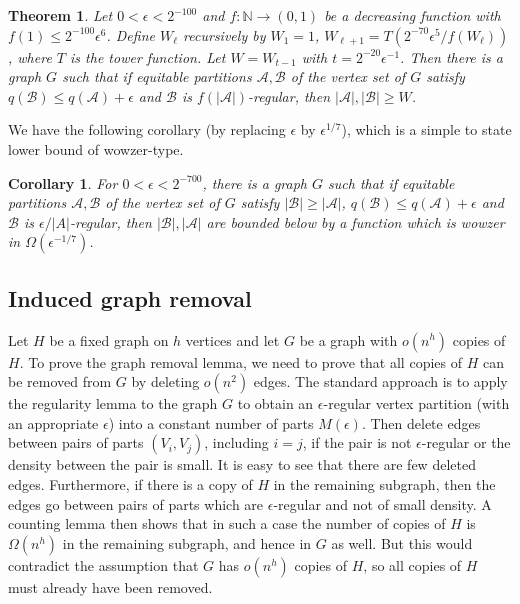 \documentclass[11pt]{article}
\newtheorem{theorem}{Theorem}[section]
\newtheorem{corollary}{Corollary}[section]
\begin{document}
\begin{theorem} \label{stronglow}
Let $0<\epsilon<2^{-100}$ and $f:\mathbb{N} \rightarrow (0,1)$ be a decreasing function with $f(1) \leq 2^{-100}\epsilon^{6}$. Define
$W_{\ell}$ recursively by $W_1=1$, $W_{\ell+1} =
T\left(2^{-70}\epsilon^5/f(W_{\ell})\right)$, where $T$ is the tower function.
Let $W=W_{t-1}$ with $t=2^{-20}\epsilon^{-1}$. Then there is a graph $G$ such
that if equitable partitions $\mathcal{A},\mathcal{B}$ of the vertex set of $G$
satisfy $q(\mathcal{B}) \leq q(\mathcal{A})+\epsilon$ and $\mathcal{B}$ is
$f(|\mathcal{A}|)$-regular, then $|\mathcal{A}|,|\mathcal{B}| \geq W$.
\end{theorem}

We have the following corollary (by replacing $\epsilon$ by $\epsilon^{1/7}$),
which is a simple to state lower bound of wowzer-type.

\begin{corollary} \label{stroncor}
For $0<\epsilon<2^{-700}$, there is a graph $G$ such that if equitable
partitions $\mathcal{A},\mathcal{B}$
of the vertex set of $G$ satisfy $|\mathcal{B}| \geq |\mathcal{A}|$,
$q(\mathcal{B}) \leq q(\mathcal{A})+\epsilon$ and $\mathcal{B}$ is $\epsilon/|A|$-regular,
then $|\mathcal{B}|, |\mathcal{A}|$ are bounded below by a function which is
wowzer in $\Omega(\epsilon^{-1/7})$.
\end{corollary}

\subsection{Induced graph removal} \label{removalsubsection}

Let $H$ be a fixed graph on $h$ vertices and let $G$ be a graph with $o(n^h)$ copies of $H$. To prove the graph removal lemma, we need to prove that all copies of $H$ can be removed from $G$ by deleting $o(n^2)$ edges. The standard approach is to apply the regularity lemma to the graph $G$ to obtain an $\epsilon$-regular vertex partition (with an appropriate $\epsilon$) into a constant number of parts $M(\epsilon)$. Then delete edges between pairs of parts
$(V_i,V_j)$, including $i=j$, if the pair is not $\epsilon$-regular or the
density between the pair is small. It is easy to see that there are few deleted
edges. Furthermore, if there is a copy of $H$ in the remaining subgraph, then
the edges go between pairs of parts which are $\epsilon$-regular and not of
small density. A counting lemma then shows that in such a case the number of
copies of $H$ is $\Omega(n^h)$ in the remaining subgraph, and hence in $G$ as
well. But this would contradict the assumption that $G$ has $o(n^h)$ copies of $H$, so all copies of $H$ must already have been removed.
\end{document}
